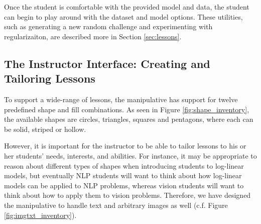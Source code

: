 \documentclass[11pt,letterpaper]{article}
\begin{document}
Once the student is comfortable with the provided model and data, the student
can begin to play around with the dataset and model options. These utilities, such as
generating a new random challenge and experimenting with regularizaiton, 
are described more in Section \ref{sec:lessons}.


\subsection{The Instructor Interface: Creating and Tailoring Lessons}
To support a wide-range of lessons, the manipulative has support for twelve predefined shape and fill combinations.
As seen in Figure \ref{fig:shape_inventory}, the available shapes are circles, triangles, squares and pentagons,
where each can be solid, striped or hollow.

However, it is important for the instructor to be able to tailor lessons to his or her students' needs, 
interests, and abilities. For instance, it may be appropriate to reason about different types of shapes
when introducing students to log-linear models, but eventually NLP students will want to think about 
how log-linear models can be applied to NLP problems, whereas vision students will want to think about 
how to apply them to vision problems. Therefore, we have designed the manipulative to handle text
and arbitrary images as well (c.f. Figure \ref{fig:imgtxt_inventory}).
\end{document}
